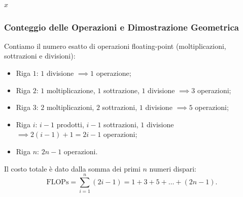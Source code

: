 \begin{algorithm}[H]
\caption{Forward Substitution (Sostituzione in Avanti)}
\label{alg:forward-substitution}
\Return $x$\;
\end{algorithm}

\subsubsection{Conteggio delle Operazioni e Dimostrazione Geometrica}
Contiamo il numero esatto di operazioni floating-point (moltiplicazioni, sottrazioni e divisioni):
\begin{itemize}
    \item Riga $1$: $1$ divisione $\implies 1$ operazione;
    \item Riga $2$: $1$ moltiplicazione, $1$ sottrazione, $1$ divisione $\implies 3$ operazioni;
    \item Riga $3$: $2$ moltiplicazioni, $2$ sottrazioni, $1$ divisione $\implies 5$ operazioni;
    \item Riga $i$: $i - 1$ prodotti, $i - 1$ sottrazioni, $1$ divisione $\implies 2(i - 1) + 1 = 2i - 1$ operazioni;
    \item Riga $n$: $2n - 1$ operazioni.
\end{itemize}

Il costo totale \`e dato dalla somma dei primi $n$ numeri dispari:
\begin{equation}
    \text{FLOPs} = \sum_{i=1}^n (2i - 1) = 1 + 3 + 5 + \dots + (2n - 1).
\end{equation}

